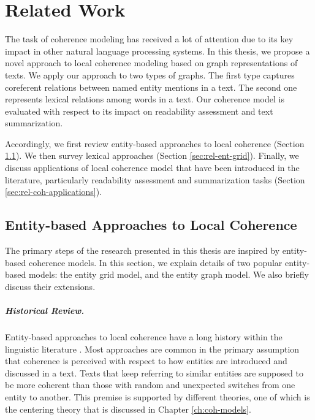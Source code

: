 
\chapter{Related Work}
\label{ch:rel-work}
 
The task of coherence modeling has received a lot of attention due to its key impact in other natural language processing systems. 
In this thesis, we propose a novel approach to local coherence modeling based on graph representations of texts. 
We apply our approach to two types of graphs.  
The first type captures coreferent relations between named entity mentions in a text.
The second one represents lexical relations among words in a text.  
Our coherence model is evaluated with respect to its impact on readability assessment and text summarization. 

Accordingly, we first review entity-based approaches to local coherence (Section \ref{sec:rel-entity-models}). 
We then survey lexical approaches (Section \ref{sec:rel-ent-grid}). 
Finally, we discuss applications of local coherence model that have been introduced in the literature, particularly readability assessment and summarization tasks (Section \ref{sec:rel-coh-applications}). 

\section{Entity-based Approaches to Local Coherence}
\label{sec:rel-entity-models}

The primary steps of the research presented in this thesis are inspired by entity-based coherence models. 
In this section, we explain details of two popular entity-based models: the entity grid model, and the entity graph model. 
We also briefly discuss their extensions.  

\paragraph{Historical Review.} Entity-based approaches to local coherence have a long history within the linguistic literature \cite{kuno72,halliday76,prince81a,joshi98}.
Most approaches are common in the primary assumption that coherence is perceived with respect to how entities are introduced and discussed in a text. 
Texts that keep referring to similar entities are supposed to be more coherent than those with random and unexpected switches from one entity to another. 
This premise is supported by different theories, one of which is the centering theory \cite{grosz95,joshi98} that is discussed in Chapter \ref{ch:coh-models}. 

